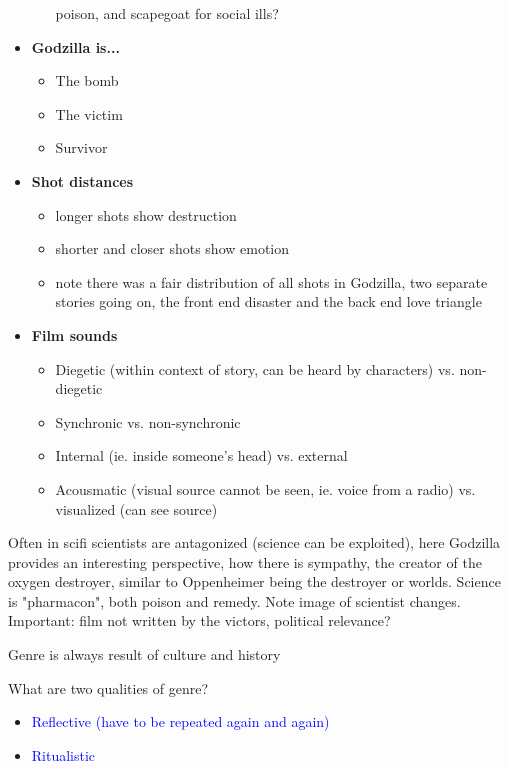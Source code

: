 \documentclass[11pt,fleqn]{book} %
\begin{document}
\begin{itemize}
\begin{itemize}
poison, and scapegoat for social ills?
    \end{itemize}
    \item \textbf{Godzilla is...}
    \begin{itemize}
        \item The bomb
        \item The victim
        \item Survivor
    \end{itemize}
    \item \textbf{Shot distances}
    \begin{itemize}
        \item longer shots show destruction
        \item shorter and closer shots show emotion
        \item note there was a fair distribution of all shots in Godzilla, two separate stories going on, the front end disaster and the back end love triangle
    \end{itemize}
    \item \textbf{Film sounds}
    \begin{itemize}
        \item Diegetic (within context of story, can be heard by characters) vs. non-diegetic
        \item Synchronic vs. non-synchronic
        \item Internal (ie. inside someone's head) vs. external 
        \item Acousmatic (visual source cannot be seen, ie. voice from a radio) vs. visualized (can see source)
    \end{itemize}
\end{itemize}
\begin{remark}
    Often in scifi scientists are antagonized (science can be exploited), here Godzilla provides an interesting perspective, how there is sympathy, the creator of the oxygen destroyer, similar to Oppenheimer being the destroyer or worlds. Science is "pharmacon", both poison and remedy. Note image of scientist changes. Important: film not written by the victors, political relevance?
\end{remark}
\begin{remark}
    Genre is always result of culture and history
\end{remark}

\begin{exercise}
What are two qualities of genre?
\begin{itemize}
\item \textcolor{blue}{Reflective (have to be repeated again and again)}
\item \textcolor{blue}{Ritualistic}
\end{itemize}
\end{exercise}
\end{document}
